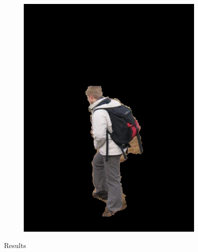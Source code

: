 \documentclass[a4paper,11]{article}
\begin{document}
\begin{center}
\begin{figure}[H]
\begin{subfigure}{.33\textwidth}
    \end{subfigure}
    \begin{subfigure}{0.33\textwidth}
      \centering
      \includegraphics[width=0.9\linewidth]{results/person3}
   \end{subfigure}
    \caption{Results}
  \end{figure}
  \end{center}
\end{document}
